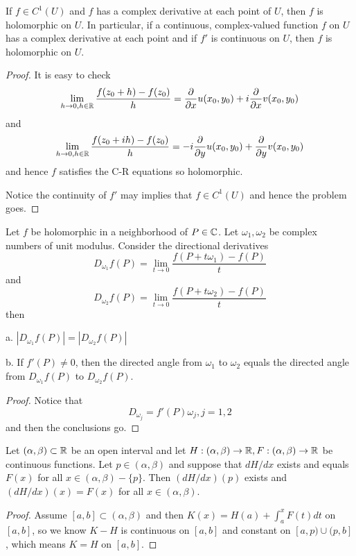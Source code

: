 \begin{theorem}
    If $f\in C^1(U)$ and $f$ has a complex derivative at each point of $U$, then $f$ is holomorphic on $U$. In particular, if a continuous, complex-valued function $f$ on $U$ has a complex derivative at each point and if $f'$ is continuous on $U$, then $f$ is holomorphic on $U$.
\end{theorem}
\begin{proof}\par
    It is easy to check
    \[\lim_{h\to 0, h\in\mathbb{R}} \dfrac{f(z_0+h)-f(z_0)}{h} = \dfrac{\partial}{\partial x} u (x_0, y_0) + i\dfrac{\partial}{\partial x} v(x_0,y_0)\]
    and
    \[
    \lim_{h\to 0, h\in \mathbb{R}}\dfrac{f(z_0+ih)-f(z_0)}{h} =  - i\dfrac{\partial}{\partial y} u(x_0,y_0) + \dfrac{\partial}{\partial y} v(x_0,y_0)
    \]
    and hence $f$ satisfies the C-R equations so holomorphic.\par
    Notice the continuity of $f'$ may implies that $f\in C^1(U)$ and hence the problem goes.
\end{proof}

\begin{theorem}
    Let $f$ be holomorphic in a neighborhood of $P\in\mathbb{C}$. Let $\omega_1,\omega_2$ be complex numbers of unit modulus. Consider the directional derivatives
    \[D_{\omega_1}f(P) = \lim_{t\to 0}\dfrac{f(P+t\omega_1)-f(P)}{t}\]
    and
    \[D_{\omega_2}f(P) = \lim_{t\to 0}\dfrac{f(P+t\omega_2)-f(P)}{t}\]
    then\par
    a. $|D_{\omega_1} f(P)| = |D_{\omega_2}f(P)|$\par
    b. If $f'(P) \neq 0$, then the directed angle from $\omega_1$ to $\omega_2$ equals the directed angle from $D_{\omega_1}f(P)$ to $D_{\omega_2} f(P)$. 
\end{theorem}
\begin{proof}\par
    Notice that
    \[D_{\omega_j} = f'(P)\omega_j, j= 1,2\]
    and then the conclusions go.
\end{proof}

\begin{lemma}
    Let $(\alpha,\beta)\subset\mathbb{R}$ be an open interval and let $H:(\alpha,\beta)\to\mathbb{R}, F:(\alpha,\beta)\to\mathbb{R}$ be continuous functions. Let $p\in(\alpha,\beta)$ and suppose that $dH/dx$ exists and equals $F(x)$ for all $x\in(\alpha,\beta)-\{p\}$. Then $(dH/dx)(p)$ exists and $(dH/dx)(x) = F(x)$ for all $x\in(\alpha,\beta)$.
\end{lemma}
\begin{proof}\par
    Assume $[a,b]\subset (\alpha,\beta)$ and then $K(x) = H(a) + \int_a^x F(t)dt$ on $[a,b]$, so we know $K-H$ is continuous on $[a,b]$ and constant on $[a,p)\cup(p,b]$, which means $K=H$ on $[a,b]$.
\end{proof}

